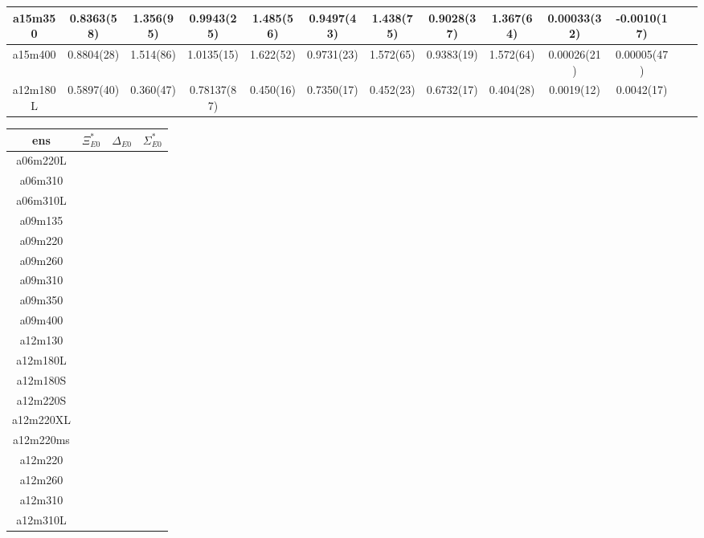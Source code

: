 \documentclass{article}
\begin{document}
\begin{table}[h!]
\begin{tabular}{|| c |c | c | c | c | c | c | c | c | c | c | c | c ||}
 \hline
 a15m350 
 & {0.8363(58)}   &   {1.356(95)} & {0.9943(25)}   & {1.485(56)}   & {0.9497(43)}  & {1.438(75)}   & {0.9028(37)}  & {1.367(64)}  & {0.00033(32)}  & {-0.0010(17)}  & \\
 \hline
a15m400
 & {0.8804(28)}   &   {1.514(86)} & {1.0135(15)}   & {1.622(52)}   & {0.9731(23)}  & {1.572(65)}   & {0.9383(19)}  & {1.572(64)}  & {0.00026(21)}  & {0.00005(47)}  &  \\
 \hline
 a12m180L 
 & {0.5897(40)}   &   {0.360(47)} & {0.78137(87)}   & {0.450(16)}   & {0.7350(17)}  & {0.452(23)}   & {0.6732(17)}  & {0.404(28)}  & {0.0019(12)}  & {0.0042(17)}  &  \\ 
\hline
 \hline
 \end{tabular}
\end{table}
\clearpage
\newpage 
\begin{table}[h!]
 \centering
 \setlength{\arrayrulewidth}{0.5mm}
\setlength{\tabcolsep}{13pt}
\renewcommand{\arraystretch}{1}
 \begin{tabular}{|| c | c | c |c ||} 
 \hline
 ens & $\Xi^*_{E0}$ & $\Delta_{E0}$ & $\Sigma^*_{E0}$ \\ [0.8ex] 
 \hline\hline
 a06m220L
  &   &   &  &     \\
 \hline
 a06m310
 &  & & &     \\
 \hline
 a06m310L
  &  & & &     \\
 \hline
 a09m135
  &  & & &     \\
 \hline
 a09m220
  &  & & &     \\
 \hline
 a09m260
  &  & & &     \\
 \hline
 a09m310
  &  & & &     \\
 \hline
 a09m350
  &  & & &     \\
 \hline
 a09m400
  &  & & &     \\
 \hline
 a12m130
  &  & & &     \\
 \hline
 a12m180L
  &  & & &     \\
 \hline
 a12m180S
 &  & & &     \\
 \hline
 a12m220S
  &  & & &     \\
 \hline
 a12m220XL
 &  & & &     \\
 \hline
 a12m220ms
  &  & & &     \\
 \hline
 a12m220
  &  & & &     \\
 \hline
 a12m260
  &  & & &     \\
 \hline
 a12m310
  &  & & &     \\
 \hline
 a12m310L
  &  & & &     \\

\end{tabular}
\end{table}
\end{document}
